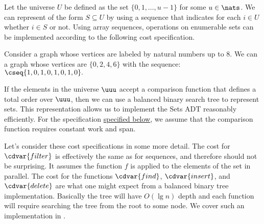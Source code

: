\begin{flex}
\label{sets:cluster:arraysets}

\begin{costspec}
\label{cost:sets::arrayseqs}

Let the universe $U$ be defined as the set 
%
$\{ 0, 1, \ldots, u-1 \}$
%
for some $u \in \nats$.
%
We can represent  of the form $S \subseteq U$ by using a sequence that indicates for each $i \in U$ whether $i \in S$ or not.
%
Using array sequences, operations on enumerable sets can be implemented according to the following cost specification.
 

\end{costspec}


\begin{example}
Consider a graph whose vertices are labeled by natural numbers up to $8$.  We can a graph whose vertices are
%
$\{ 0, 2, 4, 6 \}$ 
%
with the sequence:
%
$\cseq{ 1, 0, 1, 0, 1, 0, 1, 0 }.$ 
\end{example}

\end{flex}


\begin{gram}
If the elements in the universe $\uuu$ accept a comparison function 
that defines a total order over $\uuu$, then we can use a balanced binary search tree to represent sets.
%
This representation allows us to implement the Sets ADT reasonably efficiently.
%
For the specification \href{cost:sets::trees}{specified below}, we assume that the comparison function requires constant work and span.  
%
\end{gram}

\begin{costspec}
\label{cost:sets::trees}

\end{costspec}

\begin{gram}
Let's consider these cost specifications in some more detail.  The
cost for $\cdvar{filter}$ is effectively the same as for sequences, and
therefore should not be surprising.  It assumes the function $f$ is
applied to the elements of the set in parallel.  The cost for the
functions $\cdvar{find}$, $\cdvar{insert}$, and $\cdvar{delete}$ are
what one might expect from a balanced binary tree implementation.
Basically the tree will have $O(\lg n)$ depth and each function will
require searching the tree from the root to some node.  We cover
such an implementation in .
\end{gram}

